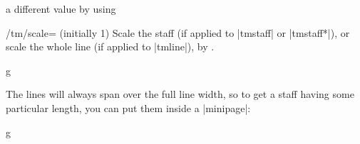 a different value by using
\begin{key}{/tm/scale= (initially 1)}
  Scale the staff (if applied to |{tmstaff}| or |{tmstaff*}|), or scale the whole 
  line (if applied to |{tmline}|), by .
\end{key}
\begin{codeexample}[]
\begin{tmline}[scale=0.7]
\begin{tmstaff}{g}{}\end{tmstaff}%
\begin{tmstaff*}{}\end{tmstaff*}%
\end{tmline}%
\end{codeexample}
The lines will always span over the full line width, so to get a staff having 
some particular length, you can put them inside a |{minipage}|:
\def\tmline{\begin{minipage}{\linewidth}\oldtmline}%
\def\endtmline{\oldendtmline\end{minipage}}%
\begin{codeexample}[]
\begin{minipage}{4cm}
\begin{tmline}
\begin{tmstaff}{g}{}\end{tmstaff}
\end{tmline}
\end{minipage}
\end{codeexample}
\def\tmline{\begin{minipage}{\linewidth-5mm}\oldtmline}%
\def\endtmline{\oldendtmline\end{minipage}}%
